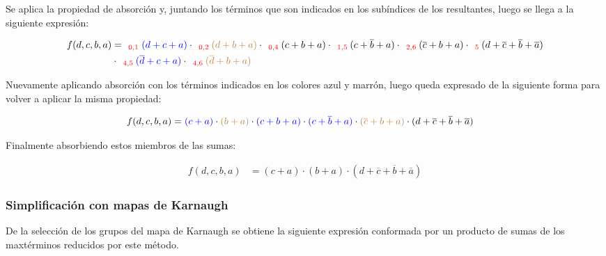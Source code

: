 Se aplica la propiedad de absorci\'on y, juntando los t\'erminos que son indicados en los sub\'indices de los 
resultantes, luego se llega a la siguiente expresi\'on:

\begin{align*}
f(d,c,b,a) & = _{\ \ \color{red} 0,1} {\color{blue} (d+c+a)}
\cdot _{\ \ \color{red} 0,2} {\color{brown} (d+b+a)}
\cdot _{\ \ \color{red} 0,4} {(c+b+a)}
\cdot _{\ \ \color{red} 1,5} {(c+\overline{b}+a)}
\cdot _{\ \ \color{red} 2,6} {(\overline{c}+b+a)}
\cdot _{\ \ \color{red} 5} {(d+\overline{c}+\overline{b}+\overline{a})} \\
& \cdot _{\ \ \color{red} 4,5} {\color{blue} (\overline{d}+c+a)}
\cdot _{\ \ \color{red} 4,6} {\color{brown} (\overline{d}+b+a)}
\end{align*}

Nuevamente aplicando absorci\'on con los t\'erminos indicados en los colores azul y marr\'on,
luego queda expresado de la siguiente forma para volver a aplicar la misma propiedad:

\begin{align*}
f(d,c,b,a) & = {\color{blue} (c+a)}
\cdot {\color{brown} (b+a)}
\cdot {\color{blue} (c+b+a)}
\cdot {\color{blue} (c+\overline{b}+a)}
\cdot {\color{brown} (\overline{c}+b+a)}
\cdot {(d+\overline{c}+\overline{b}+\overline{a})} 
\end{align*}

Finalmente absorbiendo estos miembros de las sumas:

\begin{align*}
f(d,c,b,a) & = {(c+a)}
\cdot {(b+a)}
\cdot {(d+\overline{c}+\overline{b}+\overline{a})} 
\end{align*}

\subsubsection{Simplificación con mapas de Karnaugh}

\begin{figure}[H]
    \centering
    \begin{Karnaugh}
    \end{Karnaugh}
\end{figure}

De la selecci\'on de los grupos del mapa de Karnaugh se obtiene la siguiente expresi\'on conformada por un producto
de sumas de los maxt\'erminos reducidos por este m\'etodo.

